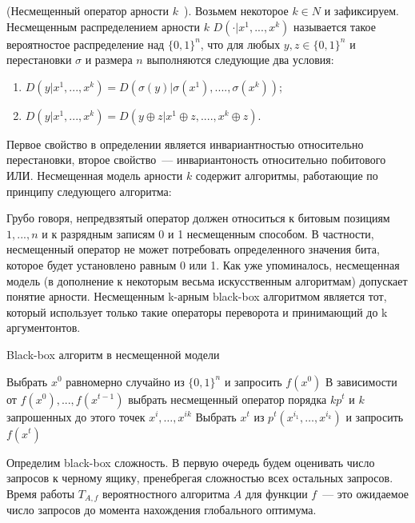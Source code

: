 \begin{definition}
(Несмещенный оператор арности $k$~\cite{1}). Возьмем некоторое $k \in  N$ и зафиксируем. Несмещенным распределением арности $k$ $D(\cdot | x^{1}, ..., x^k)$  называется такое вероятностое распределение 
над $\{0, 1\}^{n}$, что для любых $y,z \in \{0, 1 \}^n$ и перестановки $\sigma$ и размера $n$ выполняются следующие два условия:
\begin{enumerate}
\item $D ( y | x^{1},..., x^{k} ) = D(\sigma(y) | \sigma(x^{1}),...., \sigma(x^{k}))$;
\item $D ( y | x^{1},..., x^{k} ) = D(y \oplus z | x^{1} \oplus z,...., x^{k} \oplus z)$. 
\end{enumerate}
\end{definition}

Первое свойство в определении является инвариантностью относительно перестановки, второе свойство~--- инвариантоность относительно побитового ИЛИ. Несмещенная модель арности $k$ содержит алгоритмы, 
работающие по принципу следующего алгоритма:


Грубо говоря, непредвзятый оператор должен относиться к битовым позициям $1, ..., n$ и к разрядным записям 0 и 1 несмещенным способом. В частности, несмещенный оператор не может потребовать определенного значения бита, которое будет установлено равным 0 или 1. Как уже упоминалось, несмещенная модель (в дополнение к некоторым весьма искусственным алгоритмам) допускает понятие арности. Несмещенным k-арным black-box алгоритмом является тот, который использует только такие операторы переворота и  принимающий до k аргументонтов.


\begin{algorithm}[H]
\caption{Black-box алгоритм в несмещенной модели}\label{lst1}
\begin{algorithmic}
        \State Выбрать $x^0$ равномерно случайно из $\{0,1\}^n$ и запросить $f(x^0)$  
	    \State В зависимости от $f(x^0),...,f(x^{t-1})$ выбрать несмещенный оператор порядка $k p^t$ и $k$ запрошенных до этого точек $x^i,\ldots,x^{ik}$
	    \State Выбрать $x^t$ из $p^{t} (x^{i_1},\ldots,x^{i_k})$ и запросить $f(x^t)$
		\EndFor
\end{algorithmic}
\end{algorithm}

Определим black-box сложность. В первую очередь будем оценивать число запросов к черному ящику, пренебрегая сложностью всех остальных запросов. Время работы $T_{A,f}$ вероятностного алгоритма $A$ для 
функции $f$~--- это ожидаемое число запросов до момента нахождения глобального оптимума.

